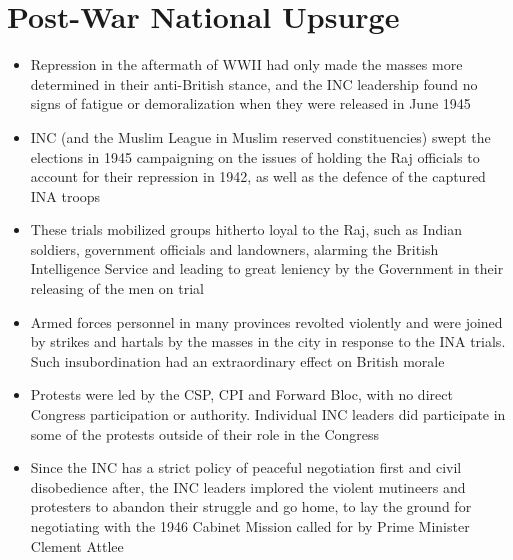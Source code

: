 \section{Post-War National Upsurge}
\begin{itemize}
    \item Repression in the aftermath of WWII had only made the masses more determined in their anti-British stance, and the INC leadership found no signs of fatigue or demoralization when they were released in June 1945
    \item INC (and the Muslim League in Muslim reserved constituencies) swept the elections in 1945 campaigning on the issues of holding the Raj officials to account for their repression in 1942, as well as the defence of the captured INA troops
    \item These trials mobilized groups hitherto loyal to the Raj, such as Indian soldiers, government officials and landowners, alarming the British Intelligence Service and leading to great leniency by the Government in their releasing of the men on trial
    \item Armed forces personnel in many provinces revolted violently and were joined by strikes and hartals by the masses in the city in response to the INA trials. Such insubordination had an extraordinary effect on British morale
    \item Protests were led by the CSP, CPI and Forward Bloc, with no direct Congress participation or authority. Individual INC leaders did participate in some of the protests outside of their role in the Congress
    \item Since the INC has a strict policy of peaceful negotiation first and civil disobedience after, the INC leaders implored the violent mutineers and protesters to abandon their struggle and go home, to lay the ground for negotiating with the 1946 Cabinet Mission called for by Prime Minister Clement Attlee
\end{itemize}

